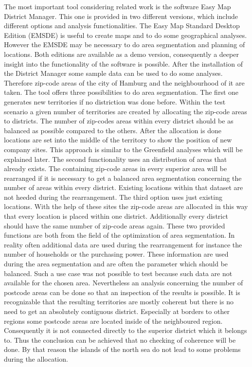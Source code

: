 The most important tool considering related work is the software Easy Map District Manager. This one is provided in two different versions, which include different options and analysis functionalities. The Easy Map Standard Desktop Edition (EMSDE) is useful to create maps and to do some geographical analyses. However the EMSDE may be necessary to do area segmentation and planning of locations. Both editions are available as a demo version, consequently a deeper insight into the functionality of the software is possible. After the installation of the District Manager some sample data can be used to do some analyses. Therefore zip-code areas of the city of Hamburg and the neighbourhood of it are taken. The tool offers three possibilities to do area segmentation. The first one generates new territories if no distriction was done before. Within the test scenario a given number of territories are created by allocating the zip-code areas to districts. The number of zip-codes areas within every district should be as balanced as possible compared to the others. After the allocation is done locations are set into the middle of the territory to show the position of new company sites. This approach is similar to the Greenfield analyses which will be explained later. The second functionality uses an distribution of areas that already exists. The containing zip-code areas in every superior area will be rearranged if it is necessary to get a balanced area segmentation concerning the number of areas within every district. Existing locations within that dataset are not heeded during the rearrangement. The third option uses just existing locations. With the help of these sites the zip-code areas are allocated in this way that every location is placed within one district. Additionally every district should have the same number of zip-code areas again. These two provided functions are both from the field of the optimization of area segmentation. In reality often additional data are used during the rearrangement for instance the number of households or the purchasing power. These information are used during the area segmentation and are often the parameter which should be balanced. Such a use case was not possible to test because such data are not available for the chosen area. Nevertheless an analysis concerning the number of postcode areas can be done so that an inspection of the results is possible. It is recognizable that the resulting territories are mostly coherent but there is no need to get an absolutely contiguous district. Especially at borders to other regions some postcode areas are located inside of the neighboured region. Consequently it is not connected directly to the superior district which it belongs to. Thus the conclusion can be achieved that no checking of coherence will be done. By that reason the islands of the north sea do not lead to some problems during the allocation. 

